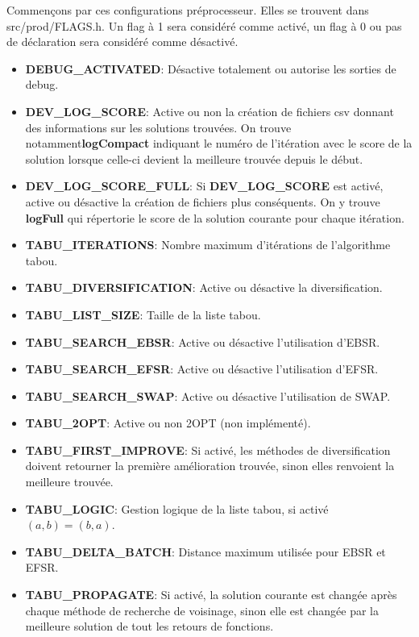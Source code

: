 \documentclass[hideweeklyreports]{polytech/polytech}
\begin{document}
				Commençons par ces configurations préprocesseur. Elles se trouvent dans src/prod/FLAGS.h. Un flag à 1 sera considéré comme activé, un flag à 0 ou pas de déclaration sera considéré comme désactivé.
				\begin{itemize}
					\item \textbf{DEBUG\_ACTIVATED}: Désactive totalement ou autorise les sorties de debug.
					\item \textbf{DEV\_LOG\_SCORE}: Active ou non la création de fichiers csv donnant des informations sur les solutions trouvées. On trouve notamment\textbf{logCompact} indiquant le numéro de l'itération avec le score de la solution lorsque celle-ci devient la meilleure trouvée depuis le début.
					\item \textbf{DEV\_LOG\_SCORE\_FULL}: Si \textbf{DEV\_LOG\_SCORE} est activé, active ou désactive la création de fichiers plus conséquents. On y trouve \textbf{logFull} qui répertorie le score de la solution courante pour chaque itération.
					\item \textbf{TABU\_ITERATIONS}: Nombre maximum d'itérations de l'algorithme tabou.
					\item \textbf{TABU\_DIVERSIFICATION}: Active ou désactive la diversification.
					\item \textbf{TABU\_LIST\_SIZE}: Taille de la liste tabou.
					\item \textbf{TABU\_SEARCH\_EBSR}: Active ou désactive l'utilisation d'EBSR.
					\item \textbf{TABU\_SEARCH\_EFSR}: Active ou désactive l'utilisation d'EFSR.
					\item \textbf{TABU\_SEARCH\_SWAP}: Active ou désactive l'utilisation de SWAP.
					\item \textbf{TABU\_2OPT}: Active ou non 2OPT (non implémenté).
					\item \textbf{TABU\_FIRST\_IMPROVE}: Si activé, les méthodes de diversification doivent retourner la première amélioration trouvée, sinon elles renvoient la meilleure trouvée.
					\item \textbf{TABU\_LOGIC}: Gestion logique de la liste tabou, si activé $\left( a,b\right)=\left( b,a\right)$.
					\item \textbf{TABU\_DELTA\_BATCH}: Distance maximum utilisée pour EBSR et EFSR.
					\item \textbf{TABU\_PROPAGATE}: Si activé, la solution courante est changée après chaque méthode de recherche de voisinage, sinon elle est changée par la meilleure solution de tout les retours de fonctions.

\end{itemize}
\end{document}
